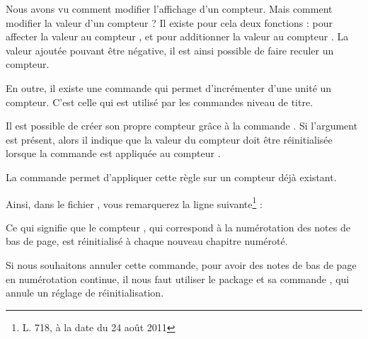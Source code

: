 Nous avons vu comment modifier l'affichage d'un compteur. Mais comment modifier la valeur d'un compteur ? Il existe pour cela deux fonctions :  pour affecter la valeur  au compteur , et  pour additionner la valeur  au compteur . La valeur ajoutée pouvant être négative, il est ainsi possible de faire reculer un compteur.

En outre, il existe une commande  qui permet d'incrémenter d'une unité un compteur. C'est celle qui est utilisé par les commandes niveau de titre.



Il est possible de créer son propre compteur grâce à la commande . Si l'argument  est présent, alors il indique que la valeur du compteur  doit être réinitialisée lorsque la commande  est appliquée au compteur .

La commande    permet d'appliquer cette règle sur un compteur déjà existant.

Ainsi, dans le fichier , vous remarquerez la ligne suivante\footnote{L. 718, à la date du 24 août 2011}  :

\begin{latexcode}
\end{latexcode} 

Ce qui signifie que le compteur  , qui correspond à la numérotation des notes de bas de page, est réinitialisé à chaque nouveau chapitre numéroté. 

Si nous souhaitons annuler cette commande, pour avoir des notes de bas de page en numérotation continue, il nous faut utiliser le package  et sa commande , qui annule un réglage de réinitialisation.

\begin{latexcode}
\usepackage{remreset}
\makeatletter
{}
\makeatother
\end{latexcode}
